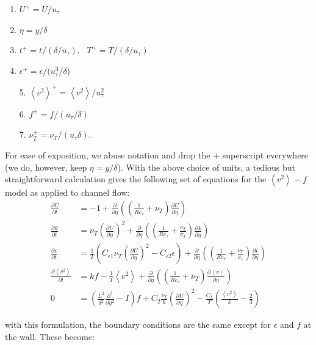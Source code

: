 \documentclass[a4paper,11pt]{article}
\newcommand{\chevron}[1]{\left\langle #1 \right\rangle}
\newcommand{\pderiv}[3][]{%
  \ensuremath{\frac{\partial^{#1} {#2}}{\partial {#3}^{#1}}}}
\newcommand{\noi}{\noindent}
\newcommand{\ep}{\epsilon}
\begin{document}
\begin{multicols}{2}
\begin{enumerate}
\item $U^+ = U\big/u_{\tau}$
\item $\eta  = y\Big/\delta$
\item $t^+ = t\Big/(\delta/u_{\tau}), \,\,\,\, T^+ = T\Big/(\delta/u_{\tau})$
\item $\epsilon^+ = \epsilon\Big/(u_{\tau}^3/\delta$)
\end{enumerate}
\columnbreak 

\begin{itemize}
\item[5.] $\chevron{v^2}^+ = \chevron{v^2}\Big/u_{\tau}^2$
\item[6.] $f^+ = f\Big/(u_{\tau}/\delta)$
\item[7.] $\nu_T^+ = \nu_T\Big/(u_{\tau} \delta)$.

\end{itemize}
\end{multicols}
For ease of exposition, we abuse notation and drop the $+$ superscript everywhere (we do, however, keep $\eta = y/\delta$). With the above choice of units, a tedious but straightforward calculation gives the following set of equations for the $\chevron{v^2}-f$ model as applied to channel flow: 
\begin{align}
	\label{eq:ssv2f1_nondim}
        \pderiv{U}{t} &= -1 +
\pderiv{}{\eta}\left(\left(\frac{1}{Re_{\tau}}+\nu_T\right)\pderiv{U}{\eta}\right) \\
        \pderiv{k}{t} &= \nu_T\left(\pderiv{U}{\eta}\right)^2 + 
\pderiv{}{\eta}\left(\left(\frac{1}{Re_{\tau}}+\frac{\nu_T}{\sigma_k}\right)\pderiv{k}{\eta}\right) \\
        \pderiv{\ep}{t} &= \frac{1}{T}\left(C_{\ep
1}\nu_T\left(\pderiv{U}{\eta}\right)^2 - C_{\ep 2}\ep\right) + 
\pderiv{}{\eta}\left(\left(\frac{1}{Re_{\tau}}+\frac{\nu_T}{\sigma_\ep}\right)\pderiv{\ep}{\eta}\right) \\
        \pderiv{\chevron{v^2}}{t} &= kf - \frac{1}{T}\chevron{v^2} +
\pderiv{}{\eta}\left(\left(\frac{1}{Re_{\tau}}+\nu_T\right)\pderiv{\chevron{v}}{\eta}\right) \\
        0 &= \left( \frac{L^2}{\delta^2} \frac{\partial^2}{\partial \eta^2} - I\right)f +
C_2\frac{\nu_T}{k}\left(\pderiv{U}{\eta}\right)^2 -
\frac{C_1}{T}\left(\frac{\chevron{v^2}}{k}-\frac{2}{3}\right)
	\label{eq:ssv2f5_nondim}
\end{align}

\noi with this formulation, the boundary conditions are the same except for
$\epsilon$ and $f$ at the wall. These become:  
\end{document}
